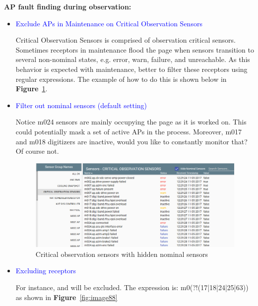 \textbf{AP fault finding during observation:}
\begin{itemize}

\item  \textcolor{blue}{Exclude APs in Maintenance on Critical Observation Sensors}

Critical Observation Sensors is comprised of observation critical sensors. Sometimes receptors in maintenance flood the page when sensors transition to several non-nominal states, e.g. error, warn, failure, and unreachable. As this behavior is expected with maintenance, better to filter these receptors using regular expressions.  The example of how to do this is shown below in \textbf{Figure}~\ref{fig:image120}.

\item \textcolor{blue}{Filter out nominal sensors (default setting)}

Notice m024 sensors are mainly occupying the page as it is worked on. This could potentially mask a set of active APs in the process. Moreover, m017 and m018 digitizers are inactive, would you like to constantly monitor that? Of course not.



\begin{figure}[!thb]
	\centering
	\includegraphics[scale=0.33]{Chapters/images/image120.png}
	\caption{Critical observation sensors with hidden nominal sensors}
	\label{fig:image120}
\end{figure}

\item \textcolor{blue}{Excluding receptors}

For instance, and  will be excluded. The expression is: m0(?!(17|18|24|25|63)) as shown in \textbf{Figure}~\ref{fig:image88}

\end{itemize}

